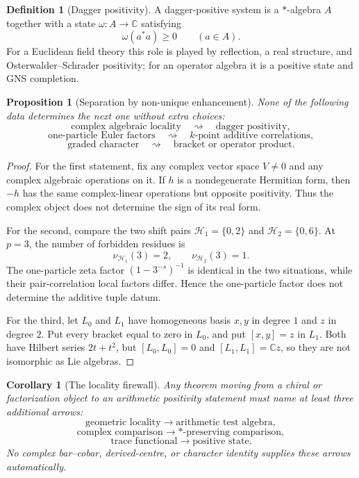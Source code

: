 \documentclass[11pt]{article}
\newtheorem{proposition}[theorem]{Proposition}
\newtheorem{corollary}[theorem]{Corollary}
\theoremstyle{definition}
\newtheorem{definition}[theorem]{Definition}
\theoremstyle{remark}
\newcommand{\CC}{\mathbb C}
\newcommand{\1}{\mathbf 1}
\newcommand{\cH}{\mathcal H}
\begin{document}
\begin{definition}[Dagger positivity]
A dagger-positive system is a $*$-algebra $A$ together with a state $\omega:A\to\CC$ satisfying
\[
\omega(a^*a)\geq0\qquad(a\in A).
\]
For a Euclidean field theory this role is played by reflection, a real structure, and Osterwalder--Schrader positivity; for an operator algebra it is a positive state and GNS completion.
\end{definition}

\begin{proposition}[Separation by non-unique enhancement]
None of the following data determines the next one without extra choices:
\[
\text{complex algebraic locality}\quad\rightsquigarrow\quad
\text{dagger positivity},
\]
\[
\text{one-particle Euler factors}\quad\rightsquigarrow\quad
\text{$k$-point additive correlations},
\]
\[
\text{graded character}\quad\rightsquigarrow\quad
\text{bracket or operator product}.
\]
\end{proposition}

\begin{proof}
For the first statement, fix any complex vector space $V\neq0$ and any complex algebraic operations on it.  If $h$ is a nondegenerate Hermitian form, then $-h$ has the same complex-linear operations but opposite positivity.  Thus the complex object does not determine the sign of its real form.

For the second, compare the two shift pairs $\cH_1=\{0,2\}$ and $\cH_2=\{0,6\}$.  At $p=3$, the number of forbidden residues is
\[
\nu_{\cH_1}(3)=2,\qquad \nu_{\cH_2}(3)=1.
\]
The one-particle zeta factor $(1-3^{-s})^{-1}$ is identical in the two situations, while their pair-correlation local factors differ.  Hence the one-particle factor does not determine the additive tuple datum.

For the third, let $L_0$ and $L_1$ have homogeneous basis $x,y$ in degree $1$ and $z$ in degree $2$.  Put every bracket equal to zero in $L_0$, and put $[x,y]=z$ in $L_1$.  Both have Hilbert series $2t+t^2$, but $[L_0,L_0]=0$ and $[L_1,L_1]=\CC z$, so they are not isomorphic as Lie algebras.
\end{proof}

\begin{corollary}[The locality firewall]
Any theorem moving from a chiral or factorization object to an arithmetic positivity statement must name at least three additional arrows:
\[
\text{geometric locality}\longrightarrow\text{arithmetic test algebra},
\]
\[
\text{complex comparison}\longrightarrow\text{$*$-preserving comparison},
\]
\[
\text{trace functional}\longrightarrow\text{positive state}.
\]
No complex bar--cobar, derived-centre, or character identity supplies these arrows automatically.
\end{corollary}
\end{document}

